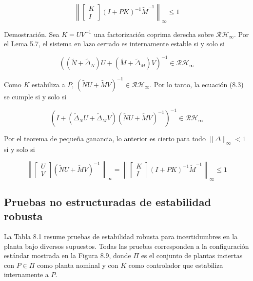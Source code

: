 $$
\left\|\left[\begin{array}{c}
K \\
I
\end{array}\right](I+P K)^{-1} \tilde{M}^{-1}\right\|_{\infty} \leq 1
$$

Demostración. Sea $K=U V^{-1}$ una factorización coprima derecha sobre $\mathcal{R} \mathcal{H}_{\infty}$. Por el Lema 5.7, el sistema en lazo cerrado es internamente estable si y solo si


\begin{equation*}
\left(\left(\tilde{N}+\tilde{\Delta}_{N}\right) U+\left(\tilde{M}+\tilde{\Delta}_{M}\right) V\right)^{-1} \in \mathcal{R} \mathcal{H}_{\infty} \tag{8.3}
\end{equation*}


Como $K$ estabiliza a $P$, $(\tilde{N} U+\tilde{M} V)^{-1} \in \mathcal{R} \mathcal{H}_{\infty}$. Por lo tanto, la ecuación (8.3) se cumple si y solo si

$$
\left(I+\left(\tilde{\Delta}_{N} U+\tilde{\Delta}_{M} V\right)(\tilde{N} U+\tilde{M} V)^{-1}\right)^{-1} \in \mathcal{R} \mathcal{H}_{\infty}
$$

Por el teorema de pequeña ganancia, lo anterior es cierto para todo $\|\Delta\|_{\infty}<1$ si y solo si

$$
\left\|\left[\begin{array}{c}
U \\
V
\end{array}\right](\tilde{N} U+\tilde{M} V)^{-1}\right\|_{\infty}=\left\|\left[\begin{array}{c}
K \\
I
\end{array}\right](I+P K)^{-1} \tilde{M}^{-1}\right\|_{\infty} \leq 1
$$

\subsection*{Pruebas no estructuradas de estabilidad robusta}
La Tabla 8.1 resume pruebas de estabilidad robusta para incertidumbres en la planta bajo diversos supuestos. Todas las pruebas corresponden a la configuración estándar mostrada en la Figura 8.9, donde $\Pi$ es el conjunto de plantas inciertas con $P \in \Pi$ como planta nominal y con $K$ como controlador que estabiliza internamente a $P$.

